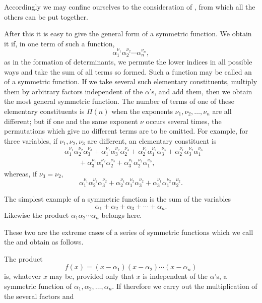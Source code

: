 
Accordingly we may confine ourselves to the consideration of , from which all the others can be put together.

After this it is easy to give the general form of a symmetric function. We obtain it if, in one term of such a function,
\[
 \alpha_1^{\nu_1}\alpha_2^{\nu_2}\cdots\alpha_n^{\nu_n},
\]
as in the formation of determinants, we permute the lower indices in all possible ways and take the sum of all terms so formed. Such a function may be called an  of a symmetric function. If we take several such elementary constituents, multiply them by arbitrary factors independent of the $\alpha$'s, and add them, then we obtain the most general symmetric function. The number of terms of one of these elementary constituents is $\Pi(n)$ when the exponents $\nu_1,\nu_2,\ldots,\nu_n$ are all different; but if one and the same exponent $\nu$ occurs several times, the permutations which give no different terms are to be omitted. For example, for three variables, if $\nu_1,\nu_2,\nu_3$ are different, an elementary constituent is
\[
\begin{aligned}
 &\alpha_1^{\nu_1}\alpha_2^{\nu_2}\alpha_3^{\nu_3}
+\alpha_1^{\nu_1}\alpha_3^{\nu_2}\alpha_2^{\nu_3}
+\alpha_2^{\nu_1}\alpha_1^{\nu_2}\alpha_3^{\nu_3}
+\alpha_2^{\nu_1}\alpha_3^{\nu_2}\alpha_1^{\nu_3}\\
 &\qquad+\alpha_3^{\nu_1}\alpha_1^{\nu_2}\alpha_2^{\nu_3}
+\alpha_3^{\nu_1}\alpha_2^{\nu_2}\alpha_1^{\nu_3},
\end{aligned}
\]
whereas, if $\nu_3=\nu_2$,
\[
 \alpha_1^{\nu_1}\alpha_2^{\nu_2}\alpha_3^{\nu_2}
+\alpha_2^{\nu_1}\alpha_1^{\nu_2}\alpha_3^{\nu_2}
+\alpha_3^{\nu_1}\alpha_1^{\nu_2}\alpha_2^{\nu_2}.
\]

The simplest example of a symmetric function is the sum of the variables
\[
 \alpha_1+\alpha_2+\alpha_3+\cdots+\alpha_n.
\]
Likewise the product $\alpha_1\alpha_2\cdots\alpha_n$ belongs here.

These two are the extreme cases of a series of symmetric functions which we call the  and obtain as follows.

The product
\begin{equation}
 f(x)=(x-\alpha_1)(x-\alpha_2)\cdots(x-\alpha_n)
\tag{1}
\end{equation}
is, whatever $x$ may be, provided only that $x$ is independent of the $\alpha$'s, a symmetric function of $\alpha_1,\alpha_2,\ldots,\alpha_n$. If therefore we carry out the multiplication of the several factors and
